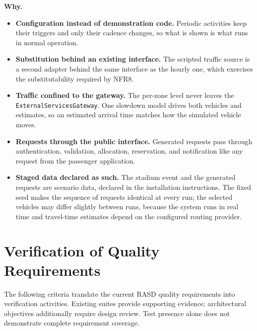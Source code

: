 \documentclass[11pt,a4paper,oneside]{report}
\renewcommand{\arraystretch}{1.22}
\newcommand{\code}[1]{\texttt{#1}}
\begin{document}
\noindent
\textbf{Why.}
\begin{itemize}

\item
  \textbf{Configuration instead of demonstration code.} Periodic
  activities keep their triggers and only their cadence changes, so what
  is shown is what runs in normal operation.

\item
  \textbf{Substitution behind an existing interface.} The scripted
  traffic source is a second adapter behind the same interface as the
  hourly one, which exercises the substitutability required by NFR8.

\item
  \textbf{Traffic confined to the gateway.} The per-zone level never
  leaves the \code{ExternalServicesGateway}. One slowdown model drives
  both vehicles and estimates, so an estimated arrival time matches how
  the simulated vehicle moves.

\item
  \textbf{Requests through the public interface.} Generated requests
  pass through authentication, validation, allocation, reservation, and
  notification like any request from the passenger application.

\item
  \textbf{Staged data declared as such.} The stadium event and the
  generated requests are scenario data, declared in the installation
  instructions. The fixed seed makes the sequence of requests identical
  at every run; the selected vehicles may differ slightly between runs,
  because the system runs in real time and travel-time estimates depend
  on the configured routing provider.

\end{itemize}

\section{Verification of Quality Requirements}
\label{quality-requirements-verification}

The following criteria translate the current RASD quality requirements
into verification activities. Existing suites provide supporting
evidence; architectural objectives additionally require design review.
Test presence alone does not demonstrate complete requirement coverage.

\begingroup
\small
\setlength{\tabcolsep}{5pt}
\renewcommand{\arraystretch}{1.2}
\end{document}

